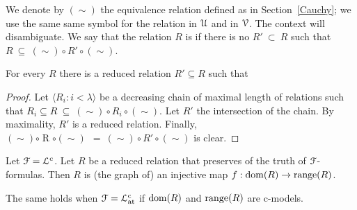 \documentclass{amsproc}
\renewcommand*{\emph}[1]{%
   \smash{\tikz[baseline]\node[rectangle, fill=teal!25, rounded corners, inner xsep=0.5ex, inner ysep=0.2ex, anchor=base, minimum height = 2.7ex]{\strut #1};}}
\begin{document}
{We denote by $(\sim)$ the equivalence relation defined as in Section~\ref{Cauchy}; we use the same same symbol for the relation in ${\EuScript U}$ and in ${\EuScript V}$.
The context will disambiguate.
We say that the relation $R$ is \emph{reduced\/} if there is no $R'\ \subset\ R$ such that $R\ \subseteq\ \mathrel{(\sim)}\circ \mathrel{R'}\circ\mathrel{(\sim)}$.

\begin{fact}
  For every $R$ there is a reduced relation $R'\subseteq R$ such that 
  
\end{fact}

\begin{proof}
  Let $\langle R_i:i<\lambda\rangle$ be a decreasing chain of maximal length of relations such that $R_i\mathrel{\subseteq}R\ \subseteq\ \mathrel{(\sim)}\circ \mathrel{R_i}\circ\mathrel{(\sim)}$.
  Let  $R'$ the intersection  of the chain.
  By maximality, $R'$ is a reduced relation.
  Finally, $\mathrel{(\sim)}\circ \mathrel{R}\circ\mathrel{(\sim)}\ \ =\ \mathrel{(\sim)}\circ \mathrel{R'}\circ\mathrel{(\sim)}$ is clear.
\end{proof}




\begin{fact}\label{fact_reduced_funct} 
  Let ${\EuScript F}={\EuScript L}^{\rm c}$.
  Let $R$ be a reduced relation that preserves of the truth of ${\EuScript F}$-formulas.
  Then $R$ is (the graph of) an injective map $f:{\rm dom}(R)\to{\rm range}(R)$.

  The same holds when ${\EuScript F}={\EuScript L}^{\rm c}_{\rm at}$ if ${\rm dom}(R)$ and ${\rm range}(R)$ are c-models.
\end{fact}

}
\end{document}
